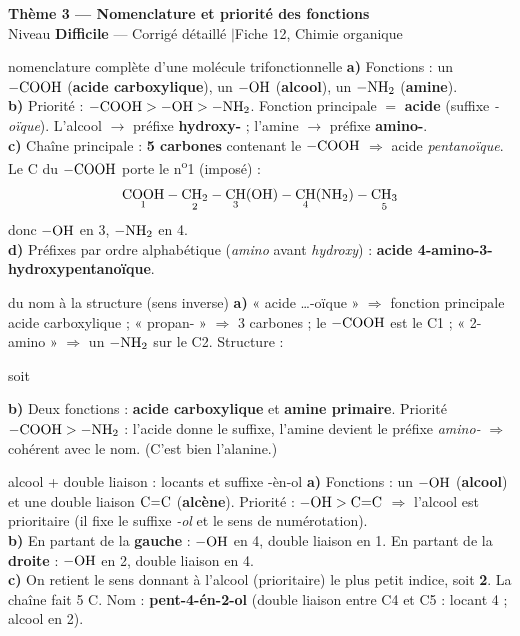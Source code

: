 \documentclass[11pt,a4paper]{article}
\newcommand{\rep}[1]{\textcolor{primarydark}{\textbf{#1}}}
\newcommand{\banner}[2]{%
\begin{tcolorbox}[enhanced,colback=excol,colframe=excol,arc=5pt,boxrule=0pt,
   left=5mm,right=5mm,top=2.5mm,bottom=2.5mm,coltext=white]
{\large\bfseries #1}\\[1pt]{\small #2}
\end{tcolorbox}\vspace{2pt}}
\begin{document}
\banner{Thème 3 — Nomenclature et priorité des fonctions}{Niveau \textbf{Difficile} — Corrigé détaillé \quad$\vert$\quad Fiche 12, Chimie organique}

\begin{corr}{nomenclature complète d'une molécule trifonctionnelle}
\textbf{a)} Fonctions : un $\ce{-COOH}$ (\rep{acide carboxylique}), un $\ce{-OH}$ (\rep{alcool}), un $\ce{-NH2}$ (\rep{amine}).\\
\textbf{b)} Priorité : $\ce{-COOH} > \ce{-OH} > \ce{-NH2}$. Fonction principale $=$ \rep{acide} (suffixe \textit{-oïque}). L'alcool $\to$ préfixe \textbf{hydroxy-} ; l'amine $\to$ préfixe \textbf{amino-}.\\
\textbf{c)} Chaîne principale : \textbf{5 carbones} contenant le $\ce{-COOH}$ $\Rightarrow$ acide \emph{pentanoïque}. Le C du $\ce{-COOH}$ porte le n\textsuperscript{o}1 (imposé) :
\[ \underset{1}{\ce{COOH}}-\underset{2}{\ce{CH2}}-\underset{3}{\ce{CH}}(\ce{OH})-\underset{4}{\ce{CH}}(\ce{NH2})-\underset{5}{\ce{CH3}} \]
donc $\ce{-OH}$ en 3, $\ce{-NH2}$ en 4.\\
\textbf{d)} Préfixes par ordre alphabétique (\emph{amino} avant \emph{hydroxy}) : \rep{acide 4-amino-3-hydroxypentanoïque}.
\end{corr}

\begin{corr}{du nom à la structure (sens inverse)}
\textbf{a)} « acide \dots-oïque » $\Rightarrow$ fonction principale acide carboxylique ; « propan- » $\Rightarrow$ 3 carbones ; le $\ce{-COOH}$ est le C1 ; « 2-amino » $\Rightarrow$ un $\ce{-NH2}$ sur le C2. Structure :
\begin{center}\qquad soit \end{center}
\textbf{b)} Deux fonctions : \rep{acide carboxylique} et \rep{amine primaire}. Priorité $\ce{-COOH} > \ce{-NH2}$ : l'acide donne le suffixe, l'amine devient le préfixe \emph{amino-} $\Rightarrow$ cohérent avec le nom. (C'est bien l'alanine.)
\end{corr}

\begin{corr}{alcool + double liaison : locants et suffixe -èn-ol}
\textbf{a)} Fonctions : un $\ce{-OH}$ (\rep{alcool}) et une double liaison $\ce{C=C}$ (\rep{alcène}). Priorité : $\ce{-OH} > \text{C=C}$ $\Rightarrow$ l'alcool est prioritaire (il fixe le suffixe \textit{-ol} et le sens de numérotation).\\
\textbf{b)} En partant de la \textbf{gauche} : $\ce{-OH}$ en 4, double liaison en 1. En partant de la \textbf{droite} : $\ce{-OH}$ en 2, double liaison en 4.\\
\textbf{c)} On retient le sens donnant à l'alcool (prioritaire) le plus petit indice, soit \textbf{2}. La chaîne fait 5 C. Nom : \rep{pent-4-én-2-ol} (double liaison entre C4 et C5 : locant 4 ; alcool en 2).
\end{corr}
\end{document}
